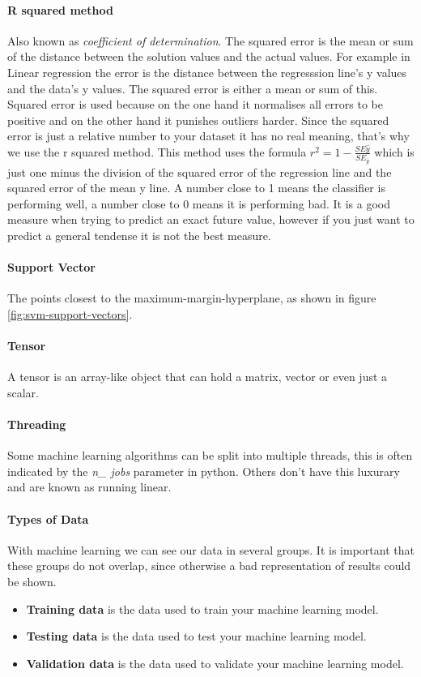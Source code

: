 \paragraph{R squared method}
Also known as \emph{coefficient of determination}. The squared error is the mean or sum of the distance between the solution values and the actual values. For example in Linear regression the error is the distance between the regresssion line's y values and the data's y values. The squared error is either a mean or sum of this. Squared error is used because on the one hand it normalises all errors to be positive and on the other hand it punishes outliers harder. Since the squared error is just a relative number to your dataset it has no real meaning, that's why we use the r squared method. This method uses the formula $r^2 = 1 - \frac{SE\hat{y}}{SE_{\overline{y}}}$ which is just one minus the division of the squared error of the regression line and the squared error of the mean y line. A number close to 1 means the classifier is performing well, a number close to 0 means it is performing bad. It is a good measure when trying to predict an exact future value, however if you just want to predict a general tendense it is not the best measure.

\paragraph{Support Vector}
The points closest to the maximum-margin-hyperplane, as shown in figure \ref{fig:svm-support-vectors}.

\paragraph{Tensor} A tensor is an array-like object that can hold a matrix, vector or even just a scalar.
\paragraph{Threading} 
Some machine learning algorithms can be split into multiple threads, this is often indicated by the \emph{n\_ jobs} parameter in python. Others don't have this luxurary and are known as running linear.

\paragraph{Types of Data} 
With machine learning we can see our data in several groups. It is important that these groups do not overlap, since otherwise a bad representation of results could be shown.
\begin{itemize}
	\item \textbf{Training data} is the data used to train your machine learning model.
	\item \textbf{Testing data} is the data used to test your machine learning model.
	\item \textbf{Validation data} is the data used to validate your machine learning model.
\end{itemize}

